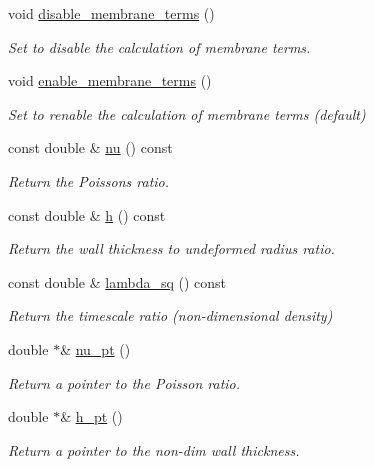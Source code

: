 \begin{DoxyCompactItemize}
void \hyperlink{classoomph_1_1KirchhoffLoveShellEquations_ae4a6f1de19bfed4958d9975a57e66438}{disable\+\_\+membrane\+\_\+terms} ()
\begin{DoxyCompactList}\small\item\em Set to disable the calculation of membrane terms. \end{DoxyCompactList}\item 
void \hyperlink{classoomph_1_1KirchhoffLoveShellEquations_adb97ea9255be485cf1f542a4d5771472}{enable\+\_\+membrane\+\_\+terms} ()
\begin{DoxyCompactList}\small\item\em Set to renable the calculation of membrane terms (default) \end{DoxyCompactList}\item 
const double \& \hyperlink{classoomph_1_1KirchhoffLoveShellEquations_a20116921726629d31d82bc55cb09130f}{nu} () const
\begin{DoxyCompactList}\small\item\em Return the Poisson\textquotesingle{}s ratio. \end{DoxyCompactList}\item 
const double \& \hyperlink{classoomph_1_1KirchhoffLoveShellEquations_aeb942282a31b23af7ee1e710f098aa43}{h} () const
\begin{DoxyCompactList}\small\item\em Return the wall thickness to undeformed radius ratio. \end{DoxyCompactList}\item 
const double \& \hyperlink{classoomph_1_1KirchhoffLoveShellEquations_a7aa4747799a388a31f42333819cf0d6e}{lambda\+\_\+sq} () const
\begin{DoxyCompactList}\small\item\em Return the timescale ratio (non-\/dimensional density) \end{DoxyCompactList}\item 
double $\ast$\& \hyperlink{classoomph_1_1KirchhoffLoveShellEquations_ab9bf30ac6d646fa1384a2ae7b8558ba0}{nu\+\_\+pt} ()
\begin{DoxyCompactList}\small\item\em Return a pointer to the Poisson ratio. \end{DoxyCompactList}\item 
double $\ast$\& \hyperlink{classoomph_1_1KirchhoffLoveShellEquations_a3afe9309aa307964592b4707735bb2c6}{h\+\_\+pt} ()
\begin{DoxyCompactList}\small\item\em Return a pointer to the non-\/dim wall thickness. \end{DoxyCompactList}\item 

\end{DoxyCompactItemize}
